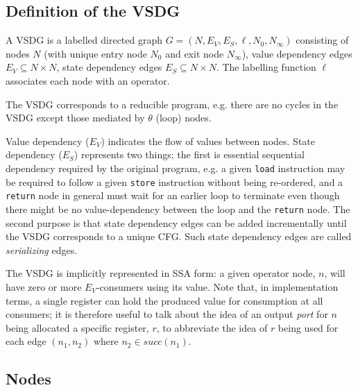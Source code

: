 
\subsection{Definition of the VSDG}

A VSDG is a labelled directed graph $G=(N,E_V,E_S,\ell,N_0,N_\infty)$
consisting of nodes $N$
(with unique entry node $N_0$ and exit node $N_\infty$),
value dependency edges $E_V \subseteq N \times N$,
state dependency edges $E_S \subseteq N \times N$.
The labelling function $\ell$ associates each node with an operator.

The VSDG corresponds to a reducible program, e.g.
there are no cycles in the VSDG except those mediated by $\theta$ (loop)
nodes.

Value dependency ($E_V$) indicates the flow of values between nodes. State dependency ($E_S$) represents two things; the first is
essential sequential dependency required by the original program, e.g.
a given \texttt{load} instruction may be required to follow a given \texttt{store} instruction
without being re-ordered, and a \texttt{return} node in general must wait for an
earlier loop to terminate even though there might be no value-dependency
between the loop and the \texttt{return} node.
The second purpose is that
state dependency edges can be added incrementally until the VSDG corresponds to
a unique CFG.
Such state dependency edges are called {\em serializing} edges.

The VSDG is implicitly
represented in SSA form: a
given operator node, $n$, will have zero or more $E_V$-consumers using its
value. Note that, in implementation terms, a single register can hold the
produced value for consumption at all consumers; it is therefore useful to
talk about the idea of an output {\em port} for $n$ being allocated a specific
register, $r$, to abbreviate the idea of $r$ being used for each edge $(n_1,n_2)$
where $n_2 \in \textit{succ}(n_1)$. %


\subsection{Nodes}

